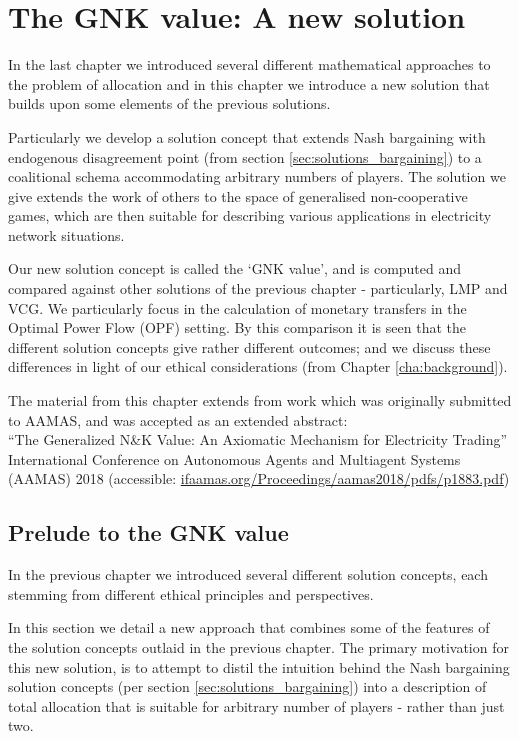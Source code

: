 \chapter{The GNK value: A new solution}
\label{cha:new_solution}

In the last chapter we introduced several different mathematical approaches to the problem of allocation and in this chapter we introduce a new solution that builds upon some elements of the previous solutions.

Particularly we develop a solution concept that extends Nash bargaining with endogenous disagreement point (from section \ref{sec:solutions_bargaining}) to a coalitional schema accommodating arbitrary numbers of players.
The solution we give extends the work of others to the space of generalised non-cooperative games, which are then suitable for describing various applications in electricity network situations.

Our new solution concept is called the `GNK value', and is computed and compared against other solutions of the previous chapter - particularly, LMP and VCG.
We particularly focus in the calculation of monetary transfers in the Optimal Power Flow (OPF) setting.
By this comparison it is seen that the different solution concepts give rather different outcomes; and we discuss these differences in light of our ethical considerations (from Chapter \ref{cha:background}).

The material from this chapter extends from work which was originally submitted to AAMAS, and was accepted as an extended abstract: \\
\-\hspace{5mm}``The Generalized N\&K Value: An Axiomatic Mechanism for Electricity Trading''\\ International Conference on Autonomous Agents and Multiagent Systems\\ (AAMAS) 2018 (accessible: \href{ifaamas.org/Proceedings/aamas2018/pdfs/p1883.pdf}{ifaamas.org/Proceedings/aamas2018/pdfs/p1883.pdf})


\section{Prelude to the GNK value}

In the previous chapter we introduced several different solution concepts, each stemming from different ethical principles and perspectives.

In this section we detail a new approach that combines some of the features of the solution concepts outlaid in the previous chapter.
The primary motivation for this new solution, is to attempt to distil the intuition behind the Nash bargaining solution concepts (per section \ref{sec:solutions_bargaining}) into a description of total allocation that is suitable for arbitrary number of players - rather than just two.



